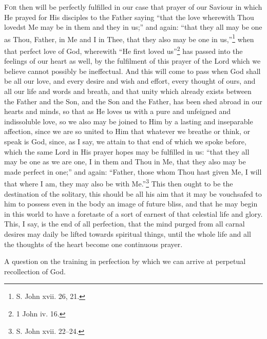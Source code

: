 \textsc{For} then will be perfectly fulfilled in our case that prayer of our Saviour in which He prayed for His disciples to the Father saying “that the love wherewith Thou lovedst Me may be in them and they in us;” and again: “that they all may be one as Thou, Father, in Me and I in Thee, that they also may be one in us,”\footnote{S. John xvii. 26, 21.} when that perfect love of God, wherewith “He first loved us”\footnote{1 John iv. 16.} has passed into the feelings of our heart as well, by the fulfilment of this prayer of the Lord which we believe cannot possibly be ineffectual. And this will come to pass when God shall be all our love, and every desire and wish and effort, every thought of ours, and all our life and words and breath, and that unity which already exists between the Father and the Son, and the Son and the Father, has been shed abroad in our hearts and minds, so that as He loves us with a pure and unfeigned and indissoluble love, so we also may be joined to Him by a lasting and inseparable affection, since we are so united to Him that whatever we breathe or think, or speak is God, since, as I say, we attain to that end of which we spoke before, which the same Lord in His prayer hopes may be fulfilled in us: “that they all may be one as we are one, I in them and Thou in Me, that they also may be made perfect in one;” and again: “Father, those whom Thou hast given Me, I will that where I am, they may also be with Me.”\footnote{S. John xvii. 22–24.} This then ought to be the destination of the solitary, this should be all his aim that it may be vouchsafed to him to possess even in the body an image of future bliss, and that he may begin in this world to have a foretaste of a sort of earnest of that celestial life and glory. This, I say, is the end of all perfection, that the mind purged from all carnal desires may daily be lifted towards spiritual things, until the whole life and all the thoughts of the heart become one continuous prayer.


A question on the training in perfection by which we can arrive at perpetual recollection of God.

